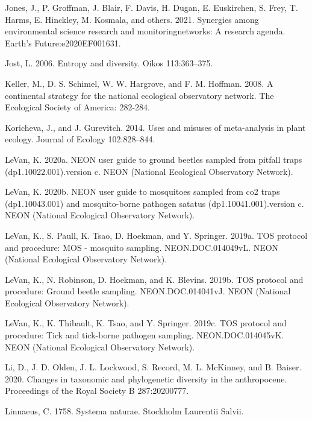 \documentclass[
  12pt,
]{article}
\newlength{\cslhangindent}
\newenvironment{cslreferences}%
  {\setlength{\parindent}{0pt}%
  \everypar{\setlength{\hangindent}{\cslhangindent}}\ignorespaces}%
  {\par}
\begin{document}
\begin{cslreferences}
\leavevmode\hypertarget{ref-jones2021synergies}{}%
Jones, J., P. Groffman, J. Blair, F. Davis, H. Dugan, E. Euskirchen, S. Frey, T. Harms, E. Hinckley, M. Kosmala, and others. 2021. Synergies among environmental science research and monitoringnetworks: A research agenda. Earth's Future:e2020EF001631.

\leavevmode\hypertarget{ref-jost2006entropy}{}%
Jost, L. 2006. Entropy and diversity. Oikos 113:363--375.

\leavevmode\hypertarget{ref-keller2008continental}{}%
Keller, M., D. S. Schimel, W. W. Hargrove, and F. M. Hoffman. 2008. A continental strategy for the national ecological observatory network. The Ecological Society of America: 282-284.

\leavevmode\hypertarget{ref-koricheva2014uses}{}%
Koricheva, J., and J. Gurevitch. 2014. Uses and misuses of meta-analysis in plant ecology. Journal of Ecology 102:828--844.

\leavevmode\hypertarget{ref-LeVan2020}{}%
LeVan, K. 2020a. NEON user guide to ground beetles sampled from pitfall traps (dp1.10022.001).version c. NEON (National Ecological Observatory Network).

\leavevmode\hypertarget{ref-LeVan2020b}{}%
LeVan, K. 2020b. NEON user guide to mosquitoes sampled from co2 traps (dp1.10043.001) and mosquito-borne pathogen satatus (dp1.10041.001).version c. NEON (National Ecological Observatory Network).

\leavevmode\hypertarget{ref-LeVan2019b}{}%
LeVan, K., S. Paull, K. Tsao, D. Hoekman, and Y. Springer. 2019a. TOS protocol and procedure: MOS - mosquito sampling. NEON.DOC.014049vL. NEON (National Ecological Observatory Network).

\leavevmode\hypertarget{ref-LeVan2019}{}%
LeVan, K., N. Robinson, D. Hoekman, and K. Blevins. 2019b. TOS protocol and procedure: Ground beetle sampling. NEON.DOC.014041vJ. NEON (National Ecological Observatory Network).

\leavevmode\hypertarget{ref-LeVan2019c}{}%
LeVan, K., K. Thibault, K. Tsao, and Y. Springer. 2019c. TOS protocol and procedure: Tick and tick-borne pathogen sampling. NEON.DOC.014045vK. NEON (National Ecological Observatory Network).

\leavevmode\hypertarget{ref-li2020changes}{}%
Li, D., J. D. Olden, J. L. Lockwood, S. Record, M. L. McKinney, and B. Baiser. 2020. Changes in taxonomic and phylogenetic diversity in the anthropocene. Proceedings of the Royal Society B 287:20200777.

\leavevmode\hypertarget{ref-linnaeus1758systema}{}%
Linnaeus, C. 1758. Systema naturae. Stockholm Laurentii Salvii.


\end{cslreferences}
\end{document}
